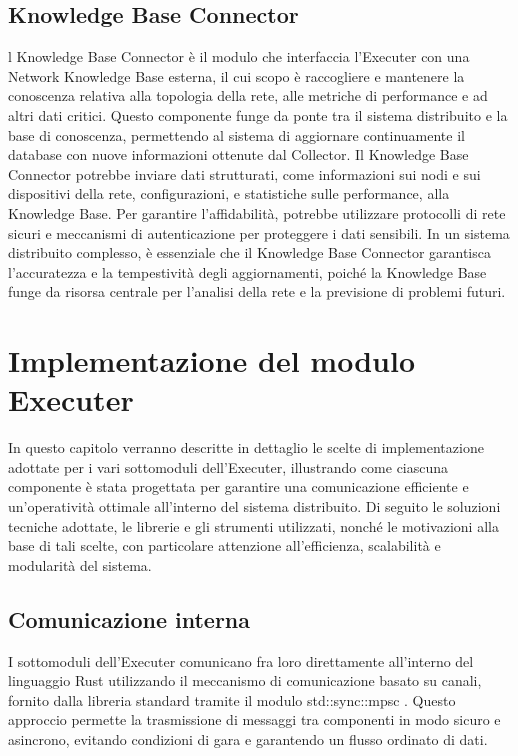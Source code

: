 \documentclass[target=bach,aauheader=,style=]{thud}
\begin{document}
\section{Knowledge Base Connector}
l Knowledge Base Connector è il modulo che interfaccia l'Executer con una Network Knowledge Base esterna, il cui scopo è raccogliere e mantenere la conoscenza relativa alla topologia della rete, alle metriche di performance e ad altri dati critici. Questo componente funge da ponte tra il sistema distribuito e la base di conoscenza, permettendo al sistema di aggiornare continuamente il database con nuove informazioni ottenute dal Collector.
Il Knowledge Base Connector potrebbe inviare dati strutturati, come informazioni sui nodi e sui dispositivi della rete, configurazioni, e statistiche sulle performance, alla Knowledge Base. Per garantire l'affidabilità, potrebbe utilizzare protocolli di rete sicuri e meccanismi di autenticazione per proteggere i dati sensibili. In un sistema distribuito complesso, è essenziale che il Knowledge Base Connector garantisca l'accuratezza e la tempestività degli aggiornamenti, poiché la Knowledge Base funge da risorsa centrale per l'analisi della rete e la previsione di problemi futuri.

\chapter{Implementazione del modulo Executer}
In questo capitolo verranno descritte in dettaglio le scelte di implementazione adottate per i vari sottomoduli dell'Executer, illustrando come ciascuna componente è stata progettata per garantire una comunicazione efficiente e un'operatività ottimale all'interno del sistema distribuito.
Di seguito le soluzioni tecniche adottate, le librerie e gli strumenti utilizzati, nonché le motivazioni alla base di tali scelte, con particolare attenzione all'efficienza, scalabilità e modularità del sistema.

\section{Comunicazione interna}
I sottomoduli dell'Executer comunicano fra loro direttamente all'interno del linguaggio Rust utilizzando il meccanismo di comunicazione basato su canali, fornito dalla libreria standard tramite il modulo std::sync::mpsc \cite{rust_mpsc}. Questo approccio permette la trasmissione di messaggi tra componenti in modo sicuro e asincrono, evitando condizioni di gara e garantendo un flusso ordinato di dati.
\end{document}
